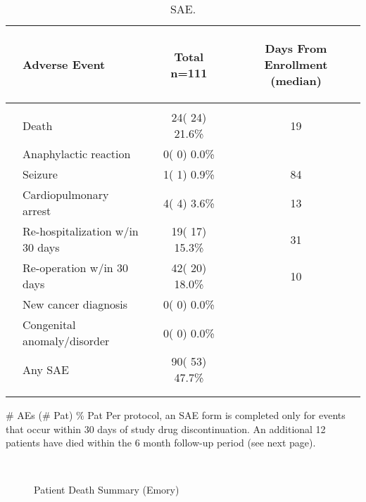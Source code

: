 \documentclass[dvips,10pt]{article}
\begin{document}
\begin{table}[t]
\caption
{ SAE. }
\begin{center}
\begin{tabular}{ @{}l@{}
@{}l@{}@{}p{1.5em}@{}@{}c@{}@{}p{1.5em}@{}@{}c@{}
}
\hline

& \parbox{6em}{\begin{center}Adverse Event\end{center}} && \parbox{6em}{\begin{center}Total n=111\end{center}} && \parbox{6em}{\begin{center}Days From Enrollment  (median)\end{center}} \\

\hline

\\
& Death && 24( 24) 21.6\% && 19 \\
& Anaphylactic reaction && 0(  0)  0.0\% &&  \\
& Seizure && 1(  1)  0.9\% && 84 \\
& Cardiopulmonary arrest && 4(  4)  3.6\% && 13 \\
& Re-hospitalization w/in 30 days && 19( 17) 15.3\% && 31 \\
& Re-operation w/in 30 days && 42( 20) 18.0\% && 10 \\
& New cancer diagnosis && 0(  0)  0.0\% &&  \\
& Congenital anomaly/disorder && 0(  0)  0.0\% &&  \\
& Any SAE && 90( 53) 47.7\% &&  \\
\\
\hline \\

\end{tabular}


\parbox{ 5in }{ \# AEs (\# Pat) \% Pat \newline Per protocol, an SAE form is completed only for events that occur within 30
  days of study drug discontinuation.  An additional 12 patients have died within
  the 6 month follow-up period (see next page). } \\
 \vspace{1em}\end{center}
 \end{table}

\begin{figure}
\caption{Patient Death Summary (Emory)}
\end{figure}
\clearpage
\end{document}
